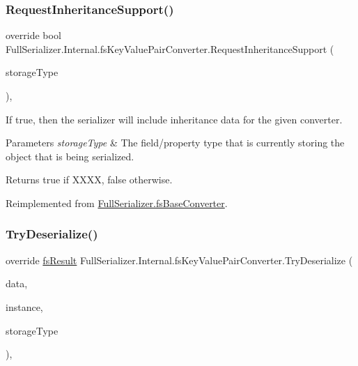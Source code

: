 \subsubsection{\texorpdfstring{Request\+Inheritance\+Support()}{RequestInheritanceSupport()}}
{\footnotesize\ttfamily override bool Full\+Serializer.\+Internal.\+fs\+Key\+Value\+Pair\+Converter.\+Request\+Inheritance\+Support (\begin{DoxyParamCaption}\item[{Type}]{storage\+Type }\end{DoxyParamCaption})\hspace{0.3cm}{\ttfamily [inline]}, {\ttfamily [virtual]}}



If true, then the serializer will include inheritance data for the given converter. 


\begin{DoxyParams}{Parameters}
{\em storage\+Type} & The field/property type that is currently storing the object that is being serialized.\\
\hline
\end{DoxyParams}
\begin{DoxyReturn}{Returns}
{\ttfamily true} if X\+X\+XX, {\ttfamily false} otherwise.
\end{DoxyReturn}


Reimplemented from \hyperlink{class_full_serializer_1_1fs_base_converter_a84447285540ab6b51efc2399d144c60c}{Full\+Serializer.\+fs\+Base\+Converter}.

\mbox{\label{class_full_serializer_1_1_internal_1_1fs_key_value_pair_converter_ab4698a9f8ed356f17a68c3936808d5d3}} 
\subsubsection{\texorpdfstring{Try\+Deserialize()}{TryDeserialize()}}
{\footnotesize\ttfamily override \hyperlink{struct_full_serializer_1_1fs_result}{fs\+Result} Full\+Serializer.\+Internal.\+fs\+Key\+Value\+Pair\+Converter.\+Try\+Deserialize (\begin{DoxyParamCaption}\item[{\hyperlink{class_full_serializer_1_1fs_data}{fs\+Data}}]{data,  }\item[{ref object}]{instance,  }\item[{Type}]{storage\+Type }\end{DoxyParamCaption})\hspace{0.3cm}{\ttfamily [inline]}, {\ttfamily [virtual]}}



